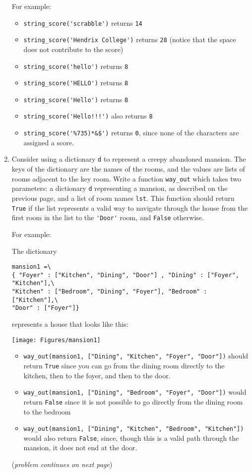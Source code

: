 \documentclass{article}
\begin{document}
\begin{enumerate}
    For example:

    \begin{itemize}
      \item \verb|string_score('scrabble')| returns \verb|14|
      \item \verb|string_score('Hendrix College')| returns \verb|28| (notice that the space does not contribute to the score)
       \item \verb|string_score('hello')| returns \verb|8|
        \item \verb|string_score('HELLO')| returns \verb|8|
      \item \verb|string_score('Hello')| returns \verb|8|
      \item \verb|string_score('Hello!!!')| also returns \verb|8|
      \item \verb|string_score('%735)*&$')| returns \verb|0|, since none of the characters are assigned a score.
    \end{itemize}

    \eject

\item Consider using a dictionary \verb|d| to represent a creepy abandoned mansion. The keys of the dictionary are the names of the rooms, and the values are lists of rooms adjacent to the key room. Write a function \verb|way_out| which takes two parameters: a dictionary \verb|d| representing a mansion, as described on the previous page, and a list of room names \verb|lst|. This function should return \verb|True| if the list represents a valid way to navigate through the house from the first room in the list to the \verb|'Door'| room, and \verb|False| otherwise.




    For example:

    The dictionary
\begin{verbatim}
mansion1 =\
{ "Foyer" : ["Kitchen", "Dining", "Door"] , "Dining" : ["Foyer", "Kitchen"],\
"Kitchen" : ["Bedroom", "Dining", "Foyer"], "Bedroom" : ["Kitchen"],\
"Door" : ["Foyer"]}
\end{verbatim}
represents a house that looks like this:

\begin{center}
  \texttt{[image: Figures/mansion1]}
\end{center}

\begin{itemize}
  \item \verb|way_out(mansion1, ["Dining", "Kitchen", "Foyer", "Door"])| should return \verb|True| since you can go from the dining room directly to the kitchen, then to the foyer, and then to the door.
  \item \verb|way_out(mansion1, ["Dining", "Bedroom", "Foyer", "Door"])| would return \verb|False| since it is not possible to go directly from the dining room to the bedroom
  \item \verb|way_out(mansion1, ["Dining", "Kitchen", "Bedroom", "Kitchen"])| would also return \verb|False|, since, though this is a valid path through the mansion, it does not end at the door.
\end{itemize}
(\emph{problem continues on next page})
\eject


\end{enumerate}
\end{document}
